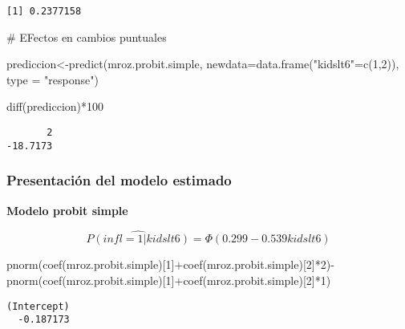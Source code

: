 \documentclass[
  letterpaper,
  DIV=11,
  numbers=noendperiod]{scrreprt}
\newenvironment{Shaded}{\begin{snugshade}}{\end{snugshade}}
\newcommand{\AttributeTok}[1]{\textcolor[rgb]{0.40,0.45,0.13}{#1}}
\newcommand{\CommentTok}[1]{\textcolor[rgb]{0.37,0.37,0.37}{#1}}
\newcommand{\DecValTok}[1]{\textcolor[rgb]{0.68,0.00,0.00}{#1}}
\newcommand{\FunctionTok}[1]{\textcolor[rgb]{0.28,0.35,0.67}{#1}}
\newcommand{\NormalTok}[1]{\textcolor[rgb]{0.00,0.23,0.31}{#1}}
\newcommand{\OtherTok}[1]{\textcolor[rgb]{0.00,0.23,0.31}{#1}}
\newcommand{\SpecialCharTok}[1]{\textcolor[rgb]{0.37,0.37,0.37}{#1}}
\newcommand{\StringTok}[1]{\textcolor[rgb]{0.13,0.47,0.30}{#1}}
\begin{document}
\begin{verbatim}
[1] 0.2377158
\end{verbatim}

\begin{Shaded}
\begin{Highlighting}[]
\CommentTok{\# EFectos en cambios puntuales}

\NormalTok{prediccion}\OtherTok{\textless{}{-}}\FunctionTok{predict}\NormalTok{(mroz.probit.simple,}
                    \AttributeTok{newdata=}\FunctionTok{data.frame}\NormalTok{(}\StringTok{"kidslt6"}\OtherTok{=}\FunctionTok{c}\NormalTok{(}\DecValTok{1}\NormalTok{,}\DecValTok{2}\NormalTok{)),}
                    \AttributeTok{type =} \StringTok{"response"}\NormalTok{)}

\FunctionTok{diff}\NormalTok{(prediccion)}\SpecialCharTok{*}\DecValTok{100}
\end{Highlighting}
\end{Shaded}

\begin{verbatim}
       2 
-18.7173 
\end{verbatim}

\subsubsection{Presentación del modelo
estimado}\label{presentaciuxf3n-del-modelo-estimado}

\textbf{Modelo probit simple}

\[
\widehat{P(infl=1|kidslt6)}=\Phi \left(0.299-0.539kidslt6\right)
\]

\begin{Shaded}
\begin{Highlighting}[]
\FunctionTok{pnorm}\NormalTok{(}\FunctionTok{coef}\NormalTok{(mroz.probit.simple)[}\DecValTok{1}\NormalTok{]}\SpecialCharTok{+}\FunctionTok{coef}\NormalTok{(mroz.probit.simple)[}\DecValTok{2}\NormalTok{]}\SpecialCharTok{*}\DecValTok{2}\NormalTok{)}\SpecialCharTok{{-}}\FunctionTok{pnorm}\NormalTok{(}\FunctionTok{coef}\NormalTok{(mroz.probit.simple)[}\DecValTok{1}\NormalTok{]}\SpecialCharTok{+}\FunctionTok{coef}\NormalTok{(mroz.probit.simple)[}\DecValTok{2}\NormalTok{]}\SpecialCharTok{*}\DecValTok{1}\NormalTok{)}
\end{Highlighting}
\end{Shaded}

\begin{verbatim}
(Intercept) 
  -0.187173 
\end{verbatim}
\end{document}
